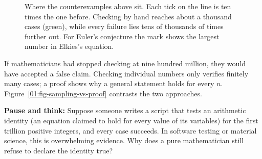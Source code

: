 \begin{figure}[htbp]
\centering
{}
\caption{Where the counterexamples above sit. Each tick on the line is ten times the one before. Checking by hand reaches about a thousand cases (green), while every failure lies tens of thousands of times further out. For Euler's conjecture the mark shows the largest number in Elkies's equation.}
\label{01:fig-counterexample-scale}
\end{figure}

If mathematicians had stopped checking at nine hundred million, they would have accepted a false claim. Checking individual numbers only verifies finitely many cases; a proof shows why a general statement holds for every $n$. Figure~\ref{01:fig-sampling-vs-proof} contrasts the two approaches.

\begin{recoverybox}
\textbf{Pause and think:} Suppose someone writes a script that tests an arithmetic identity (an equation claimed to hold for every value of its variables) for the first trillion positive integers, and every case succeeds. In software testing or material science, this is overwhelming evidence. Why does a pure mathematician still refuse to declare the identity true?
\end{recoverybox}

